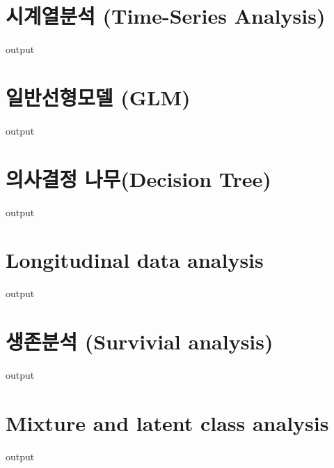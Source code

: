 \documentclass{book}
\begin{document}
\section{시계열분석 (Time-Series Analysis) }
\begin{Schunk}
\begin{Soutput}
output
\end{Soutput}
\end{Schunk}

\section{일반선형모델 (GLM)}
\begin{Schunk}
\begin{Soutput}
output
\end{Soutput}
\end{Schunk}

\section{의사결정 나무(Decision Tree)}
\begin{Schunk}
\begin{Soutput}
output
\end{Soutput}
\end{Schunk}

\section{Longitudinal data analysis}
\begin{Schunk}
\begin{Soutput}
output
\end{Soutput}
\end{Schunk}

\section{생존분석 (Survivial analysis)}
\begin{Schunk}
\begin{Soutput}
output
\end{Soutput}
\end{Schunk}

\section{Mixture and latent class analysis}
\begin{Schunk}
\begin{Soutput}
output
\end{Soutput}
\end{Schunk}
\end{document}
